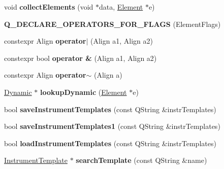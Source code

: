 \begin{DoxyCompactItemize}
\item 
\mbox{\label{namespace_ms_a5173158057bbfcd55ea8224da7356e80}} 
void {\bfseries collect\+Elements} (void $\ast$data, \hyperlink{class_ms_1_1_element}{Element} $\ast$e)
\item 
\mbox{\label{namespace_ms_a18df658a228b81865c79f5fd3b69c62f}} 
{\bfseries Q\+\_\+\+D\+E\+C\+L\+A\+R\+E\+\_\+\+O\+P\+E\+R\+A\+T\+O\+R\+S\+\_\+\+F\+O\+R\+\_\+\+F\+L\+A\+GS} (Element\+Flags)
\item 
\mbox{\label{namespace_ms_ad5571b2dcdf38982b94c05c498c5514c}} 
constexpr Align {\bfseries operator$\vert$} (Align a1, Align a2)
\item 
\mbox{\label{namespace_ms_a9f83501783dcf53ea72b09e496dc8dfb}} 
constexpr bool {\bfseries operator \&} (Align a1, Align a2)
\item 
\mbox{\label{namespace_ms_ad8c005441322bd7487749765a389b078}} 
constexpr Align {\bfseries operator$\sim$} (Align a)
\item 
\mbox{\label{namespace_ms_a8c6bbb1a5e52ed39d90661beb655f89f}} 
\hyperlink{class_ms_1_1_dynamic}{Dynamic} $\ast$ {\bfseries lookup\+Dynamic} (\hyperlink{class_ms_1_1_element}{Element} $\ast$e)
\item 
\mbox{\label{namespace_ms_a1cafeb0272044d3d844e38ff06c0fdad}} 
bool {\bfseries save\+Instrument\+Templates} (const Q\+String \&instr\+Templates)
\item 
\mbox{\label{namespace_ms_ae8e85937a608e826543b0d41a0218534}} 
bool {\bfseries save\+Instrument\+Templates1} (const Q\+String \&instr\+Templates)
\item 
\mbox{\label{namespace_ms_a8a3647db47c43c34ec9ac72599823229}} 
bool {\bfseries load\+Instrument\+Templates} (const Q\+String \&instr\+Templates)
\item 
\mbox{\label{namespace_ms_ab63c884f318a7043c2025b866ab7a949}} 
\hyperlink{class_ms_1_1_instrument_template}{Instrument\+Template} $\ast$ {\bfseries search\+Template} (const Q\+String \&name)

\end{DoxyCompactItemize}
